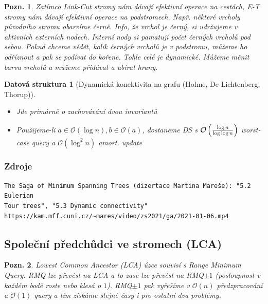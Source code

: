 \documentclass{article}
\theoremstyle{noparens}
\newtheorem*{ds}{Datová struktura}
\theoremstyle{noparens-mys}
\theoremstyle{noparens-note}
\newtheorem*{note}{Pozn.}
\newcommand{\OO}{\mathcal{O}}
\begin{document}
\begin{note}
    Zatímco Link-Cut stromy nám dávají efektivní operace na cestách, E-T stromy
    nám dávají efektivní operace na podstromech.  Např. některé vrcholy
    původního stromu obarvíme černě.  Info, že vrchol je černý, si udržujeme v
    aktivních externích nodech.  Interní nody si pamatují počet černých vrcholů
    pod sebou.  Pokud chceme vědět, kolik černých vrcholů je v podstromu,
    můžeme ho odříznout a pak se podívat do kořene.  Tohle celé
    je dynamické.  Můžeme měnit barvu vrcholů a můžeme přidávat a ubírat hrany.
\end{note}

\begin{ds}[Dynamická konektivita na grafu (Holme, De Lichtenberg, Thorup)]
    ~

    \begin{itemize}
        \item Jde primárně o zachovávání dvou invariantů
        \item Použijeme-li $a \in \OO(\log n), b \in \OO(a)$, dostaneme DS s
            $\OO\left({{\log n} \over {\log \log n}}\right)$ worst-case query a
            $\OO\left({{\log^2 n}}\right)$ amort. update
    \end{itemize}
\end{ds}

\subsubsection*{Zdroje}

\begin{verbatim}
The Saga of Minimum Spanning Trees (dizertace Martina Mareše): "5.2 Eulerian
Tour trees", "5.3 Dynamic connectivity"
https://kam.mff.cuni.cz/~mares/video/zs2021/ga/2021-01-06.mp4
\end{verbatim}


\subsection{Společní předchůdci ve stromech (LCA)}

\begin{note}
    Lowest Common Ancestor (LCA) úzce souvisí s Range Minimum Query.  RMQ lze
    převést na LCA a to zase lze převést na RMQ$\pm1$ (posloupnost v každém
    bodě roste nebo klesá o $1$). RMQ$\pm1$ pak vyřešíme v $\OO(n)$
    předzpracování a $\OO(1)$ query a tím získáme stejné časy i pro ostatní dva
    problémy.
\end{note}
\end{document}
